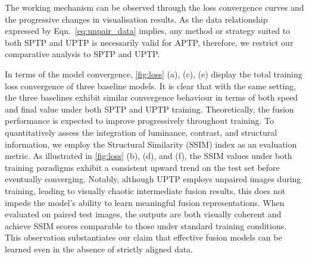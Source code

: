 The working mechanism can be observed through the loss convergence curves and the progressive changes in visualisation results. 
As the data relationship expressed by Eqn.~\eqref{eq:unpair_data} implies, any method or strategy suited to both SPTP and UPTP is necessarily valid for APTP, therefore, we restrict our comparative analysis to SPTP and UPTP.

In terms of the model convergence, \cref{fig:loss} (a), (c), (e) display the total training loss convergence of three baseline models. 
It is clear that with the same setting, the three baselines exhibit similar convergence behaviour in terms of both speed and final value under both SPTP and UPTP training. 
Theoretically, the fusion performance is expected to improve progressively throughout training. 
To quantitatively assess the integration of luminance, contrast, and structural information, we employ the Structural Similarity (SSIM) index as an evaluation metric. 
As illustrated in \cref{fig:loss} (b), (d), and (f), the SSIM values under both training paradigms exhibit a consistent upward trend on the test set before eventually converging. 
Notably, although UPTP employs unpaired images during training, leading to visually chaotic intermediate fusion results, this does not impede the model's ability to learn meaningful fusion representations. 
When evaluated on paired test images, the outputs are both visually coherent and achieve SSIM scores comparable to those under standard training conditions. 
This observation substantiates our claim that effective fusion models can be learned even in the absence of strictly aligned data.


